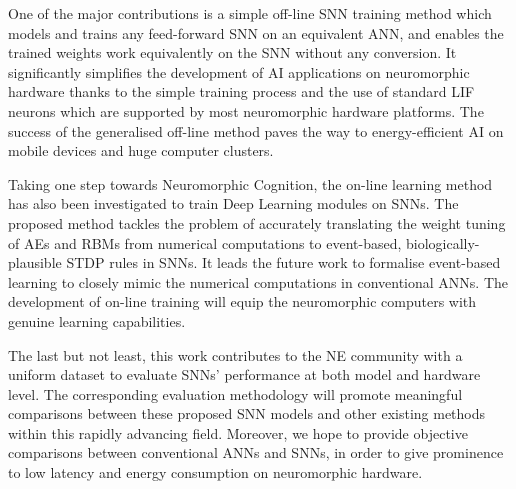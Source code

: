 One of the major contributions is a simple off-line SNN training method which models and trains any feed-forward SNN on an equivalent ANN, and enables the trained weights work equivalently on the SNN without any conversion.
It significantly simplifies the development of AI applications on neuromorphic hardware thanks to the simple training process and the use of standard LIF neurons which are supported by most neuromorphic hardware platforms.
The success of the generalised off-line method paves the way to energy-efficient AI on mobile devices and huge computer clusters.


Taking one step towards Neuromorphic Cognition, the on-line learning method has also been investigated to train Deep Learning modules on SNNs.
The proposed method tackles the problem of accurately translating the weight tuning of AEs and RBMs from numerical computations to event-based, biologically-plausible STDP rules in SNNs.
It leads the future work to formalise event-based learning to closely mimic the numerical computations in conventional ANNs.
The development of on-line training will equip the neuromorphic computers with genuine learning capabilities.

The last but not least, this work contributes to the NE community with a uniform dataset to evaluate SNNs' performance at both model and hardware level.
The corresponding evaluation methodology will promote meaningful comparisons between these proposed SNN models and other existing methods within this rapidly advancing field.
Moreover, we hope to provide objective comparisons between conventional ANNs and SNNs, in order to give prominence to low latency and energy consumption on neuromorphic hardware.

